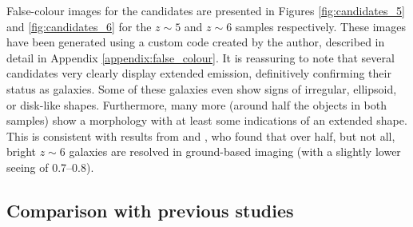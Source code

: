 False-colour images for the candidates are presented in Figures \ref{fig:candidates_5} and \ref{fig:candidates_6} for the $z\sim5$ and $z\sim6$ samples respectively. These images have been generated using a custom code created by the author, described in detail in Appendix \ref{appendix:false_colour}. It is reassuring to note that several candidates very clearly display extended emission, definitively confirming their status as galaxies. Some of these galaxies even show signs of irregular, ellipsoid, or disk-like shapes. Furthermore, many more (around half the objects in both samples) show a morphology with at least some indications of an extended shape. This is consistent with results from \cite{2015MNRAS.452.1817B} and \cite{2013AJ....145....4W}, who found that over half, but not all, bright $z\sim6$ galaxies are resolved in ground-based imaging (with a slightly lower seeing of \SIrange[range-phrase = \text{--}, range-units = single]{0.7}{0.8}{\arcsec}). \par 


\subsection{Comparison with previous studies}

